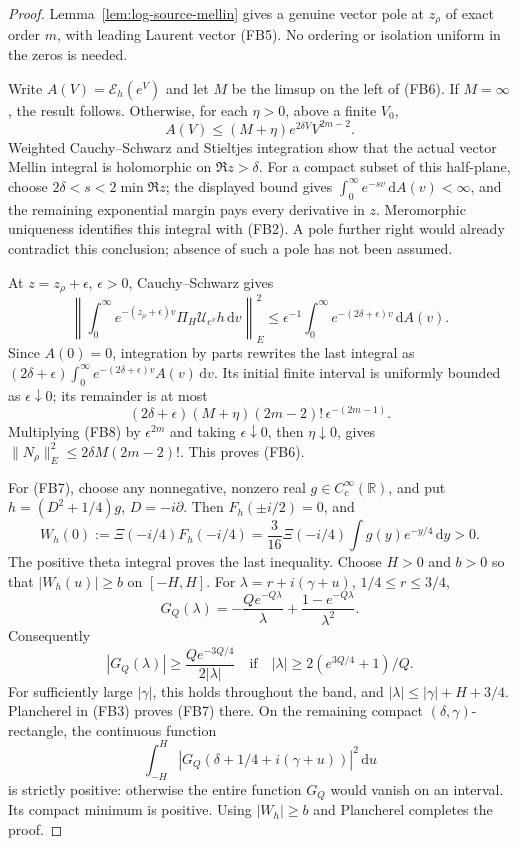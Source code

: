 \documentclass[11pt]{article}
\theoremstyle{remark}\newtheorem{remark}[theorem]{Remark}
\newcommand{\R}{\mathbb R}
\newcommand{\dd}{\,\mathrm d}
\begin{document}
\begin{proof}
Lemma~\ref{lem:log-source-mellin} gives a genuine vector pole at
\(z_\rho\) of exact order \(m\), with leading Laurent vector
(FB5). No ordering or isolation uniform in the zeros is needed.

Write \(A(V)=\mathcal E_h(e^V)\) and let \(M\) be the limsup
on the left of (FB6). If \(M=\infty\), the result follows.
Otherwise, for each \(\eta>0\), above a finite \(V_0\),
\[
 A(V)\le(M+\eta)e^{2\delta V}V^{2m-2}.
\]
Weighted Cauchy--Schwarz and Stieltjes integration show that the
actual vector Mellin integral is holomorphic on \(\Re z>\delta\).
For a compact subset of this half-plane, choose
\(2\delta<s<2\min\Re z\); the displayed bound gives
\(\int_0^\infty e^{-sv}\dd A(v)<\infty\), and the remaining
exponential margin pays every derivative in \(z\).
Meromorphic uniqueness identifies this integral with (FB2).
A pole further right would already contradict this conclusion;
absence of such a pole has not been assumed.

At \(z=z_\rho+\epsilon\), \(\epsilon>0\), Cauchy--Schwarz gives
\[
 \left\|\int_0^\infty e^{-(z_\rho+\epsilon)v}
                    \Pi_H\mathcal U_{e^v}h\dd v\right\|_E^2
 \le \epsilon^{-1}\int_0^\infty
                   e^{-(2\delta+\epsilon)v}\dd A(v).
 \tag{FB8}
\]
Since \(A(0)=0\), integration by parts rewrites the last
integral as
\((2\delta+\epsilon)\int_0^\infty
 e^{-(2\delta+\epsilon)v}A(v)\dd v\).
Its initial finite interval is uniformly bounded as
\(\epsilon\downarrow0\); its remainder is at most
\[
 (2\delta+\epsilon)(M+\eta)(2m-2)!\,
                                      \epsilon^{-(2m-1)} .
\]
Multiplying (FB8) by \(\epsilon^{2m}\) and taking
\(\epsilon\downarrow0\), then \(\eta\downarrow0\), gives
\(\|N_\rho\|_E^2\le2\delta M(2m-2)!\). This proves (FB6).

For (FB7), choose any nonnegative, nonzero real
\(g\in C_c^\infty(\R)\), and put \(h=(D^2+1/4)g\),
\(D=-i\partial\). Then \(F_h(\pm i/2)=0\), and
\[
 W_h(0):=\Xi(-i/4)F_h(-i/4)
       =\frac3{16}\Xi(-i/4)\int g(y)e^{-y/4}\dd y>0 .
\]
The positive theta integral proves the last inequality.
Choose \(H>0\) and \(b>0\) so that
\(|W_h(u)|\ge b\) on \([-H,H]\).
For \(\lambda=r+i(\gamma+u)\), \(1/4\le r\le3/4\),
\[
 G_Q(\lambda)=-\frac{Qe^{-Q\lambda}}{\lambda}
                      +\frac{1-e^{-Q\lambda}}{\lambda^2}.
\]
Consequently
\[
 |G_Q(\lambda)|\ge\frac{Qe^{-3Q/4}}{2|\lambda|}
 \quad\text{if}\quad
 |\lambda|\ge 2(e^{3Q/4}+1)/Q .
\]
For sufficiently large \(|\gamma|\), this holds throughout
the band, and \(|\lambda|\le|\gamma|+H+3/4\). Plancherel
in (FB3) proves (FB7) there. On the remaining compact
\((\delta,\gamma)\)-rectangle, the continuous function
\[
 \int_{-H}^H
    |G_Q(\delta+1/4+i(\gamma+u))|^2\dd u
\]
is strictly positive: otherwise the entire function \(G_Q\)
would vanish on an interval. Its compact minimum is positive.
Using \(|W_h|\ge b\) and Plancherel completes the proof.
\end{proof}
\end{document}
